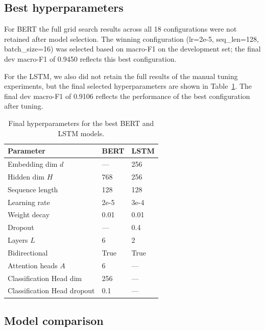 \subsection{Best hyperparameters}

For BERT the full grid search results across all 18 configurations were not retained after model selection. The winning configuration (lr=2e-5, seq\_len=128, batch\_size=16) was selected based on macro-F1 on the development set; the final dev macro-F1 of 0.9450 reflects this best configuration.

For the LSTM, we also did not retain the full results of the manual tuning experiments, but the final selected hyperparameters are shown in Table~\ref{tab:hyperparameters}. The final dev macro-F1 of 0.9106 reflects the performance of the best configuration after tuning.

\begin{table}[H]
\centering
\small
\begin{tabular}{lll}
\toprule
\textbf{Parameter} & \textbf{BERT} & \textbf{LSTM} \\
\midrule
Embedding dim $d$       & ---                & 256 \\
Hidden dim $H$          & 768                & 256 \\
Sequence length         & 128                & 128 \\
Learning rate           & 2e-5               & 3e-4 \\
Weight decay            & 0.01               & 0.01 \\
Dropout                 & ---                & 0.4 \\
Layers $L$              & 6                 & 2 \\
Bidirectional           & True               & True \\
Attention heads $A$     & 6                 & --- \\
Classification Head dim                & 256                & --- \\
Classification Head dropout            & 0.1                & --- \\
\bottomrule
\end{tabular}
\caption{Final hyperparameters for the best BERT and LSTM models.}
\label{tab:hyperparameters}
\end{table}

\subsection{Model comparison}

